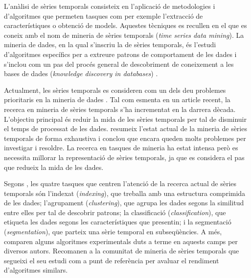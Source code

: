 L'anàlisi de sèries temporals consisteix en l'aplicació de
metodologies i d'algoritmes que permeten tasques com per exemple
l'extracció de característiques o obtenció de models.  Aquestes
tècniques es recullen en el que es coneix amb el nom de mineria de
sèries temporals (\emph{time series data mining}). La mineria de
dades, en la qual s'inscriu la de sèries temporals, és l'estudi
d'algoritmes específics per a extreure patrons de comportament de les
dades i s'inclou com un pas del procés general de descobriment de
coneixement a les bases de dades (\emph{knowledge discovery in
  databases}) \parencite{fayyad96,last01}.

Actualment, les sèries temporals es consideren com un dels deu problemes
prioritaris en la mineria de dades \parencite{yangwu06}. Tal com
esmenta \textcite{fu11} en un article recent, la recerca en mineria de
sèries temporals s'ha incrementat en la darrera dècada. L'objectiu
principal és reduir la mida de les sèries temporals per tal de
disminuir el temps de processat de les dades.  \citeauthor{fu11}
resumeix l'estat actual de la mineria de sèries temporals de forma
exhaustiva i conclou que encara queden molts problemes per investigar
i resoldre. La recerca en tasques de mineria ha estat intensa però es
necessita millorar la representació de sèries temporals, ja que es
considera el pas que redueix la mida de les dades.

Segons \textcite{keogh02}, les quatre tasques que centren l'atenció de
la recerca actual de sèries temporals són l'indexat (\emph{indexing}),
que treballa amb una estructura comprimida de les dades; l'agrupament
(\emph{clustering}), que agrupa les dades segons la similitud entre
elles per tal de descobrir patrons; la classificació
(\emph{classification}), que etiqueta les dades segons les
característiques que presentin; i la segmentació
(\emph{segmentation}), que parteix una sèrie temporal en
subseqüències.  A més, \citeauthor{keogh02} comparen alguns algoritmes
experimentals duts a terme en aquests camps per diversos
autors. Recomanen a la comunitat de mineria de sèries temporals que
segueixi el seu estudi com a punt de referència per avaluar el
rendiment d'algoritmes similars.

